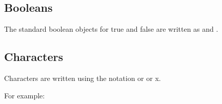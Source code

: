 \subsection{Booleans}

The standard boolean objects for true and false are written as
\schtrue{} and \schfalse.

\subsection{Characters}

Characters are written using the notation
\sharpsign\backwhack{}\index{#\@\texttt{\sharpsign\backwhack}} or
\sharpsign\backwhack{} or
\sharpsign\backwhack{}x.

For example:

